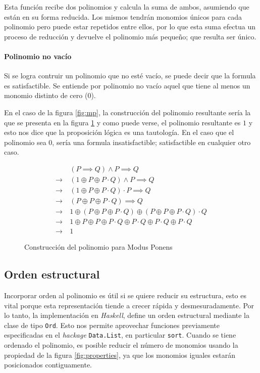 Esta función recibe dos polinomios y calcula la suma de ambos, asumiendo que están en su forma reducida. Los mismos tendrán monomios únicos para cada polinomio pero puede estar repetidos entre ellos, por lo que esta suma efectua un proceso de reducción y devuelve el polinomio más pequeño; que resulta ser único.

\paragraph{Polinomio no vacío}

Si se logra contruir un polinomio que no esté vacío, se puede decir que la formula es satisfactible. Se entiende por polinomio no vacío aquel que tiene al menos un monomio distinto de cero ($0$).

En el caso de la figura \ref{fig:mp}, la construcción del polinomio resultante sería la que se presenta en la figura \ref{fig:mp_anf} y como puede verse, el polinomio resultante es $1$ y esto nos dice que la proposición lógica es una tautología. En el caso que el polinomio sea $0$, sería una formula insatisfactible; satisfactible en cualquier otro caso.

\begin{figure}
\begin{align*}
                 & (P\implies Q)\land P \implies Q\\
    \rightarrow\ & (1 \oplus P \oplus P\cdot Q)\land P \implies Q\\
    \rightarrow\ & (1 \oplus P \oplus P\cdot Q)\cdot P \implies Q\\
    \rightarrow\ & (P \oplus P \oplus P\cdot Q) \implies Q\\
    \rightarrow\ & 1 \oplus (P \oplus P \oplus P\cdot Q) \oplus (P \oplus P \oplus P\cdot Q)\cdot Q\\
    \rightarrow\ & 1 \oplus P \oplus P \oplus P\cdot Q \oplus P\cdot Q\oplus P\cdot Q \oplus P\cdot Q \\
    \rightarrow\ & 1
\end{align*}
\caption{Construcción del polinomio para Modus Ponens}
\label{fig:mp_anf}
\end{figure}

\subsection{Orden estructural}

Incorporar orden al polinomio es útil si se quiere reducir su estructura, esto es vital porque esta representación tiende a crecer rápida y desmesuradamente. Por lo tanto, la implementación en \textit{Haskell}, define un orden estructural mediante la clase de tipo \texttt{Ord}. Esto nos permite aprovechar funciones previamente especificadas en el \textit{hackage} \texttt{Data.List}, en particular \texttt{sort}. Cuando se tiene ordenado el polinomio, es posible reducir el número de monomios usando la propiedad de la figura \ref{fig:properties}, ya que los monomios iguales estarán posicionados contiguamente.

